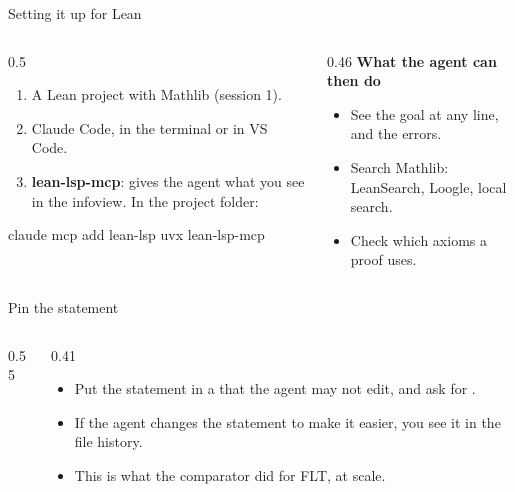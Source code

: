 \documentclass[10pt, aspectratio=169]{beamer}
\begin{document}
\begin{frame}[fragile]{Setting it up for Lean}
\begin{columns}[T]
\begin{column}{0.5\textwidth}
\begin{enumerate}
\item A Lean project with Mathlib (session 1).
\item Claude Code, in the terminal or in VS Code.
\item \textbf{lean-lsp-mcp}: gives the agent what you see in the infoview. In the project folder:
\end{enumerate}
\begin{leanout}[title={\scriptsize\sffamily Terminal}]
claude mcp add lean-lsp uvx lean-lsp-mcp
\end{leanout}
\end{column}
\begin{column}{0.46\textwidth}
\textbf{\color{leanblue}What the agent can then do}
\begin{itemize}
\item See the goal at any line, and the errors.
\item Search Mathlib: LeanSearch, Loogle, local search.
\item Check which axioms a proof uses.
\end{itemize}
\end{column}
\end{columns}

\end{frame}

\begin{frame}[fragile]{Pin the statement\livedemo}
\begin{columns}[T]
\begin{column}{0.55\textwidth}
\end{column}
\begin{column}{0.41\textwidth}
\begin{itemize}
\item Put the statement in a  that the agent may not edit, and ask for .
\item If the agent changes the statement to make it easier, you see it in the file history.
\item This is what the comparator did for FLT, at scale.
\end{itemize}
\end{column}
\end{columns}
\end{frame}
\end{document}
